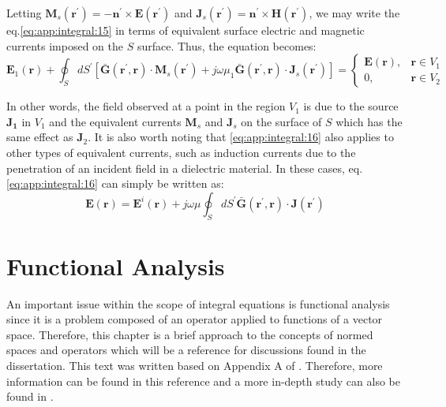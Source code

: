 		Letting $\mathbf{M}_s(\mathbf{r^\prime}) = - \mathbf{n^\prime}\times\mathbf{E}(\mathbf{r^\prime})$ and $\mathbf{J}_s(\mathbf{r^\prime}) = \mathbf{n^\prime}\times\mathbf{H}(\mathbf{r^\prime})$, we may write the eq.\eqref{eq:app:integral:15} in terms of equivalent surface electric and magnetic currents imposed on the $S$ surface. Thus, the equation becomes:
		\begin{equation}
			\mathbf{E}_1(\mathbf{r}) + \oint_S dS^\prime  \left[\mathbf{\bar{G}}(\mathbf{r^\prime},\mathbf{r})\cdot\mathbf{M}_s(\mathbf{r^\prime}) +j\omega\mu_1\mathbf{\bar{G}}(\mathbf{r^\prime},\mathbf{r})\cdot\mathbf{J}_s(\mathbf{r^\prime})\right] = \begin{cases}
				\mathbf{E}(\mathbf{r}), &\mathbf{r}\in V_1 \\
				0, &\mathbf{r}\in V_2
			\end{cases} \label{eq:app:integral:16}
		\end{equation}

		In other words, the field observed at a point in the region $V_1$ is due to the source $\mathbf {J_1}$ in $V_1$ and the equivalent currents $\mathbf{M}_s$ and $\mathbf{J}_s$ on the surface of $S$ which has the same effect as $\mathbf{J}_2$. It is also worth noting that \eqref{eq:app:integral:16} also applies to other types of equivalent currents, such as induction currents due to the penetration of an incident field in a dielectric material. In these cases, eq.\eqref{eq:app:integral:16} can simply be written as:
		\begin{equation}
			\mathbf{E}(\mathbf{r}) = \mathbf{E}^i(\mathbf{r}) + j\omega\mu\oint_S dS^\prime\mathbf{\bar{G}}(\mathbf{r^\prime},\mathbf{r})\cdot\mathbf{J}(\mathbf{r^\prime}) \label{eq:app:integral:final}
		\end{equation}

	\chapter{Functional Analysis}\label{app:functional}
	
		An important issue within the scope of integral equations is functional analysis since it is a problem composed of an operator applied to functions of a vector space. Therefore, this chapter is a brief approach to the concepts of normed spaces and operators which will be a reference for discussions found in the dissertation. This text was written based on Appendix A of  \citep{kirsch2011introduction}. Therefore, more information can be found in this reference and a more in-depth study can also be found in \citep{lebedev1996functional}.

